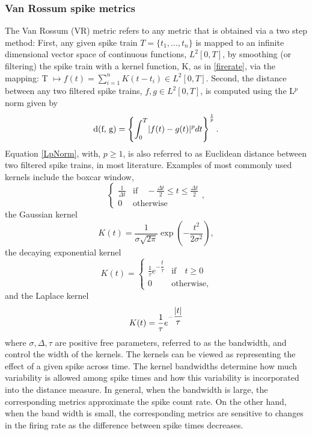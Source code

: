 \subsubsection{Van Rossum spike metrics}
The Van Rossum (VR) metric \cite{Rossum2001,houghton2010measuring} refers to any metric that is obtained via a two step method:
First, any given spike train $T = \{t_{1}, \ldots, t_{n} \}$ is mapped to an infinite dimensional vector space of continuous functions, $L^{2}[0, T]$, by smoothing (or filtering) the spike train with a kernel function, K, as in \eqref{firerate}, via the mapping:
T $\displaystyle \mapsto f(t) = \sum_{i=1}^{n} K(t-t_{i}) \in L^{2}[0, T].$
Second, the distance between any two filtered spike trains, $f, g \in L^{2}[0,T]$, is computed using the L$^{p}$ norm given by
\begin{equation}\label{LpNorm}
\text{d(f, g)} = 
\displaystyle \left \{ \int_{0}^{T} \lvert f(t) - g(t)\rvert^{p} dt 
\right \}^{\frac{1}{p}}.
\end{equation}
Equation \eqref{LpNorm}, with, $p \geq 1$, is also referred to as Euclidean
distance between two filtered spike trains, in most literature.
Examples of most commonly used kernels include the boxcar window,
\[   
\begin{cases} 
    \frac{1}{\Delta t} & \text{if} \quad  -\frac{\Delta t}{2} \leq t \leq \frac{\Delta t}{2} \\
0 & \text{otherwise}        
\end{cases},
\]
the Gaussian kernel
\[
K(t) = \frac{1}{\sigma \sqrt{2\pi}} \exp(-\dfrac{t^{2}}{2\sigma^2}),
\]
the decaying exponential kernel
\[
K(t) = \begin{cases} 
    \frac{1}{\tau}e^{-\dfrac{t}{\tau}} & \text{if} \quad t \geq 0  \\
0 & \text{otherwise},        
\end{cases}
\]
and the Laplace kernel
\[
K(t) = \frac{1}{\tau}e^{-\dfrac{\lvert t\rvert}{\tau}}  
\]
where $\sigma, \Delta, \tau$ are positive free parameters, referred to as the bandwidth, and control the width of the kernels.
The kernels can be viewed as representing the effect of a given spike across time. The kernel bandwidths determine how much variability is allowed among spike times and how this variability is incorporated into the distance measure.
In general, when the bandwidth is large, the corresponding metrics approximate
the spike count rate. On the other hand, when the band width is small, the corresponding metrics are sensitive to changes in the firing rate as the difference between spike times decreases.






